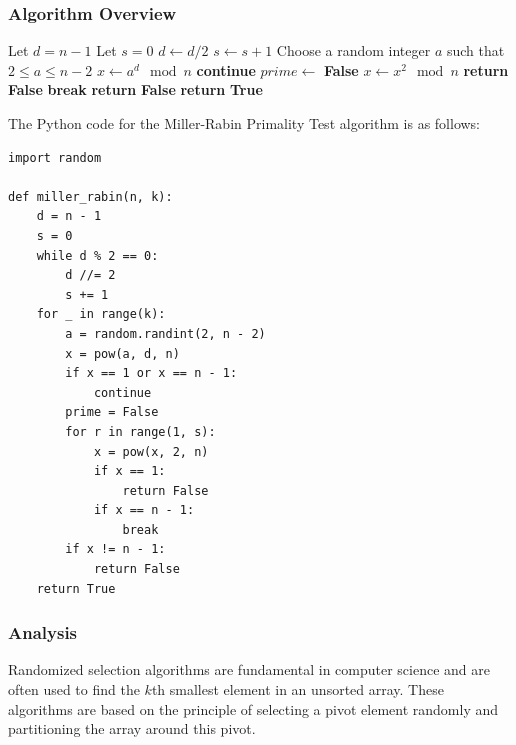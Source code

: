 \documentclass[12pt]{book} %
\begin{document}
\subsubsection{Algorithm Overview}
\FloatBarrier
\begin{algorithm}
\caption{Miller-Rabin Primality Test}
\begin{algorithmic}[1]
    \State Let $d = n-1$
    \State Let $s = 0$
        \State $d \gets d / 2$
        \State $s \gets s + 1$
    \EndWhile
        \State Choose a random integer $a$ such that $2 \leq a \leq n-2$
        \State $x \gets a^d \mod n$
            \State \textbf{continue}
        \EndIf
        \State $prime \gets$ \textbf{False}
            \State $x \gets x^2 \mod n$
                \State \textbf{return} \textbf{False} 
            \EndIf
                \State \textbf{break}
            \EndIf
        \EndFor
            \State \textbf{return} \textbf{False} 
        \EndIf
    \EndFor
    \State \textbf{return} \textbf{True} 
\EndFunction
\end{algorithmic}
\end{algorithm}
\FloatBarrier
The Python code for the Miller-Rabin Primality Test algorithm is as follows:
\FloatBarrier
\begin{lstlisting}
import random

def miller_rabin(n, k):
    d = n - 1
    s = 0
    while d % 2 == 0:
        d //= 2
        s += 1
    for _ in range(k):
        a = random.randint(2, n - 2)
        x = pow(a, d, n)
        if x == 1 or x == n - 1:
            continue
        prime = False
        for r in range(1, s):
            x = pow(x, 2, n)
            if x == 1:
                return False
            if x == n - 1:
                break
        if x != n - 1:
            return False
    return True
\end{lstlisting}
\FloatBarrier
\subsubsection{Analysis}
Randomized selection algorithms are fundamental in computer science and are often used to find the $k$th smallest element in an unsorted array. These algorithms are based on the principle of selecting a pivot element randomly and partitioning the array around this pivot.
\end{document}
